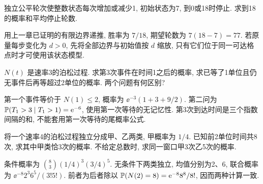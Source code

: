 \begin{exercise}
独立公平轮次使整数状态每次增加或减少1, 初始状态为7, 到0或18时停止. 求到18的概率和平均停止轮数.
\end{exercise}
\begin{solution}
用上一章已证明的有限边界递推, 胜率为 $7/18$, 期望轮数为 $7(18-7)=77$. 若原量每步变化为 $d>0$, 先将全部边界与初始值按 $d$ 缩放, 只有它们位于同一可达格点时才可使用该状态模型.
\end{solution}

\begin{exercise}
$N(t)$ 是速率3的泊松过程. 求第3次事件在时间1之后的概率, 求已等了1单位且仍无事件后再等超过2单位的概率. 两个问题有何区别?
\end{exercise}
\begin{solution}
第一个事件等价于 $N(1)\le2$, 概率为 $\ee^{-3}(1+3+9/2)$. 第二问为 $\mathbb P(T_1>3\mid T_1>1)=\mathrm e^{-6}$, 使用第一次等待的无记忆性. 第3次到达时间是三个指数间隔的和, 不能套用第一次等待的尾概率公式.
\end{solution}

\begin{exercise}
将一个速率4的泊松过程独立分成甲、乙两类, 甲概率为 $1/4$. 已知前2单位时间共8次, 求其中甲类恰3次的概率. 不给定总数时, 求同一窗口甲3次乙5次的概率.
\end{exercise}
\begin{solution}
条件概率为 $\binom83(1/4)^3(3/4)^5$. 无条件下两类独立, 均值分别为2、6, 联合概率为 $\ee^{-8}2^3 6^5/(3!5!)$. 前者为后者除以 $\mathbb P(N(2)=8)=\mathrm e^{-8}8^8/8!$, 因而两种计算一致.
\end{solution}
